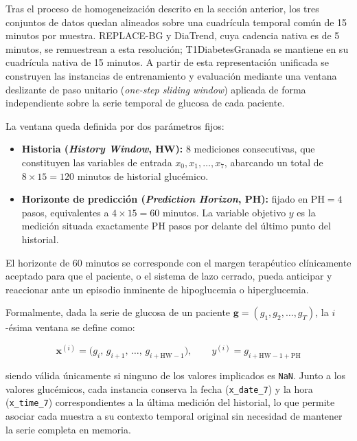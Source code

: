Tras el proceso de homogeneización descrito en la sección anterior, los tres conjuntos
de datos quedan alineados sobre una cuadrícula temporal común de 15 minutos por muestra.
REPLACE-BG y DiaTrend, cuya cadencia nativa es de 5 minutos, se remuestrean a esta
resolución;
T1DiabetesGranada se mantiene en su cuadrícula nativa de 15 minutos.
A partir de esta representación unificada se construyen las instancias de entrenamiento
y evaluación mediante una ventana deslizante de paso unitario
(\emph{one-step sliding window}) aplicada de forma independiente sobre la serie
temporal de glucosa de cada paciente.

La ventana queda definida por dos parámetros fijos:

\begin{itemize}
    \item \textbf{Historia (\emph{History Window}, HW):} 8 mediciones consecutivas,
    que constituyen las variables de entrada $x_0, x_1, \ldots, x_7$,
    abarcando un total de $8 \times 15 = 120$ minutos de historial glucémico.

    \item \textbf{Horizonte de predicción (\emph{Prediction Horizon}, PH):}
    fijado en PH$= 4$ pasos, equivalentes a $4 \times 15 = 60$ minutos.
    La variable objetivo $y$ es la medición situada exactamente PH pasos
    por delante del último punto del historial.
\end{itemize}

El horizonte de 60 minutos se corresponde con el margen terapéutico clínicamente
aceptado para que el paciente, o el sistema de lazo cerrado, pueda anticipar y
reaccionar ante un episodio inminente de hipoglucemia o hiperglucemia.

Formalmente, dada la serie de glucosa de un paciente
$\mathbf{g} = (g_1, g_2, \ldots, g_T)$, la $i$-ésima ventana se define como:

\begin{equation}
    \mathbf{x}^{(i)} = \bigl(g_i,\, g_{i+1},\, \ldots,\, g_{i+\text{HW}-1}\bigr),
    \qquad
    y^{(i)} = g_{i + \text{HW} - 1 + \text{PH}}
    \label{eq:ventana}
\end{equation}

siendo válida únicamente si ninguno de los valores implicados es \texttt{NaN}.
Junto a los valores glucémicos, cada instancia conserva la fecha
(\texttt{x\_date\_7}) y la hora (\texttt{x\_time\_7}) correspondientes a la
última medición del historial, lo que permite asociar cada muestra a su contexto
temporal original sin necesidad de mantener la serie completa en memoria.


